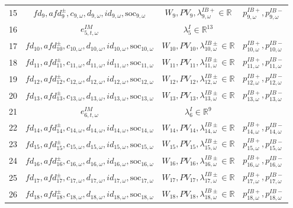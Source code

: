 \documentclass{article}
\newcommand{\R}{\mathbb{R}}
\newcommand{\soc}{\text{soc}}
\begin{document}
\begin{table}
\begin{tabular}{c c c c}
	15 & $fd_9, afd^{\pm}_9, c_{9, \omega}, d_{9, \omega}, id_{9, \omega}, \soc_{9, \omega}$ & $W_9, PV_9, \lambda^{IB+}_{9, \omega} \in \R$ & $p^{IB+}_{9, \omega}, p^{IB-}_{9, \omega}$\\
	16 & $e^{IM}_{5, t, \omega}$ & $\lambda^I_5 \in \R^{13}$ &   \\
	17 & $fd_{10}, afd^{\pm}_{10}, c_{10, \omega}, d_{10, \omega}, id_{10, \omega}, \soc_{10, \omega}$ & $W_{10}, PV_{10}, \lambda^{IB\pm}_{10, \omega} \in \R$ & $p^{IB+}_{10, \omega}, p^{IB-}_{10, \omega}$ \\
	18 & $fd_{11}, afd^{\pm}_{11}, c_{11, \omega}, d_{11, \omega}, id_{11, \omega}, \soc_{11, \omega}$ & $W_{11}, PV_{11}, \lambda^{IB\pm}_{11, \omega} \in \R$ & $p^{IB+}_{11, \omega}, p^{IB-}_{11, \omega}$ \\
	19 & $fd_{12}, afd^{\pm}_{12}, c_{12, \omega}, d_{12, \omega}, id_{12, \omega}, \soc_{12, \omega}$ & $W_{12}, PV_{12}, \lambda^{IB\pm}_{12, \omega} \in \R$ & $p^{IB+}_{12, \omega}, p^{IB-}_{12, \omega}$ \\
	20 & $fd_{13}, afd^{\pm}_{13}, c_{13, \omega}, d_{13, \omega}, id_{13, \omega}, \soc_{13, \omega}$ & $W_{13}, PV_{13}, \lambda^{IB\pm}_{13, \omega} \in \R$ & $p^{IB+}_{13, \omega}, p^{IB-}_{13, \omega}$ \\
	21 & $e^{IM}_{6, t, \omega}$ & $\lambda^I_6 \in \R^{9}$ &   \\
	22 & $fd_{14}, afd^{\pm}_{14}, c_{14, \omega}, d_{14, \omega}, id_{14, \omega}, \soc_{14, \omega}$ & $W_{14}, PV_{14}, \lambda^{IB\pm}_{14, \omega} \in \R$ & $p^{IB+}_{14, \omega}, p^{IB-}_{14, \omega}$ \\
	23 & $fd_{15}, afd^{\pm}_{15}, c_{15, \omega}, d_{15, \omega}, id_{15, \omega}, \soc_{15, \omega}$ & $W_{15}, PV_{15}, \lambda^{IB\pm}_{15, \omega} \in \R$ & $p^{IB+}_{15, \omega}, p^{IB-}_{15, \omega}$ \\
	24 & $fd_{16}, afd^{\pm}_{16}, c_{16, \omega}, d_{16, \omega}, id_{16, \omega}, \soc_{16, \omega}$ & $W_{16}, PV_{16}, \lambda^{IB\pm}_{16, \omega} \in \R$ & $p^{IB+}_{16, \omega}, p^{IB-}_{16, \omega}$ \\
	25 & $fd_{17}, afd^{\pm}_{17}, c_{17, \omega}, d_{17, \omega}, id_{17, \omega}, \soc_{17, \omega}$ & $W_{17}, PV_{17}, \lambda^{IB\pm}_{17, \omega} \in \R$ & $p^{IB+}_{17, \omega}, p^{IB-}_{17, \omega}$ \\
	26 & $fd_{18}, afd^{\pm}_{18}, c_{18, \omega}, d_{18, \omega}, id_{18, \omega}, \soc_{18, \omega}$ & $W_{18}, PV_{18}, \lambda^{IB\pm}_{18, \omega} \in \R$ &  $p^{IB+}_{18, \omega}, p^{IB-}_{18, \omega}$ \\

\end{tabular}
\end{table}
\end{document}
